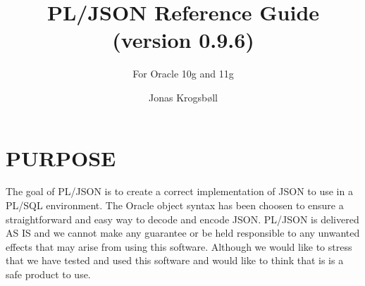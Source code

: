 \documentclass[11pt,a4paper]{article}
\title{PL/JSON Reference Guide (version 0.9.6)}
\subtitle{For Oracle 10g and 11g}
\author{Jonas Krogsbøll}
\date{}
\begin{document}
\maketitle
\vspace{2in}
\tableofcontents
\newpage

\section{PURPOSE}
The goal of PL/JSON is to create a correct implementation of JSON to use in a PL/SQL environment. The Oracle object syntax has been choosen to ensure a straightforward and easy way to decode and encode JSON. PL/JSON is delivered AS IS and we cannot make any guarantee or be held responsible to any unwanted effects that may arise from using this software. Although we would like to stress that we have tested and used this software and would like to think that is is a safe product to use.
\end{document}
